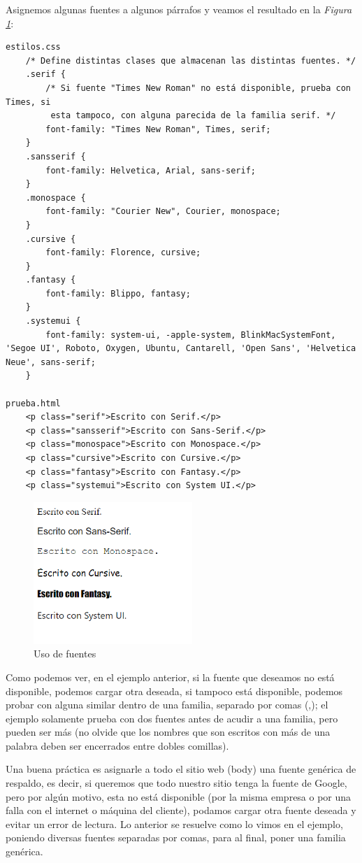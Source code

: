 Asignemos algunas fuentes a algunos párrafos y veamos el resultado en la \textit{Figura \ref{fig: 3}}:
\begin{lstlisting}
estilos.css
    /* Define distintas clases que almacenan las distintas fuentes. */
    .serif {
        /* Si fuente "Times New Roman" no está disponible, prueba con Times, si
         esta tampoco, con alguna parecida de la familia serif. */
        font-family: "Times New Roman", Times, serif;
    }
    .sansserif {
        font-family: Helvetica, Arial, sans-serif;
    }
    .monospace {
        font-family: "Courier New", Courier, monospace;
    }
    .cursive {
        font-family: Florence, cursive;
    }
    .fantasy {
        font-family: Blippo, fantasy;
    }
    .systemui {
        font-family: system-ui, -apple-system, BlinkMacSystemFont, 'Segoe UI', Roboto, Oxygen, Ubuntu, Cantarell, 'Open Sans', 'Helvetica Neue', sans-serif;
    }

prueba.html
    <p class="serif">Escrito con Serif.</p>
    <p class="sansserif">Escrito con Sans-Serif.</p> 
    <p class="monospace">Escrito con Monospace.</p> 
    <p class="cursive">Escrito con Cursive.</p> 
    <p class="fantasy">Escrito con Fantasy.</p>
    <p class="systemui">Escrito con System UI.</p>
\end{lstlisting}
\begin{figure}[H]
    \centering
    \caption{Uso de fuentes}
    \label{fig: 3}
    \includegraphics[width=6cm]{ss/fuentes.png}
\end{figure}

Como podemos ver, en el ejemplo anterior, si la fuente que deseamos no está disponible, podemos cargar otra deseada, si tampoco está disponible, podemos probar con alguna similar dentro de una familia, separado por comas (,); el ejemplo solamente prueba con dos fuentes antes de acudir a una familia, pero pueden ser más (no olvide que los nombres que son escritos con más de una palabra deben ser encerrados entre dobles comillas).

Una buena práctica es asignarle a todo el sitio web (body) una fuente genérica de respaldo, es decir, si queremos que todo nuestro sitio tenga la fuente de Google, pero por algún motivo, esta no está disponible (por la misma empresa o por una falla con el internet o máquina del cliente), podamos cargar otra fuente deseada y evitar un error de lectura. Lo anterior se resuelve como lo vimos en el ejemplo, poniendo diversas fuentes separadas por comas, para al final, poner una familia genérica.


